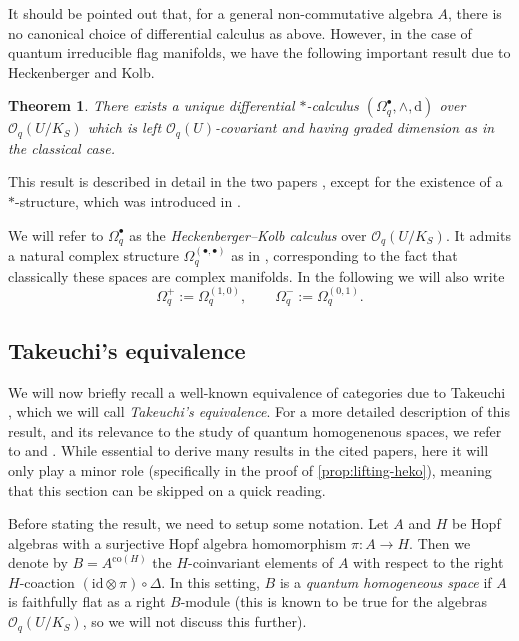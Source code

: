 \documentclass[a4paper,12pt,reqno,english]{amsart}
\numberwithin{equation}{section}
\numberwithin{figure}{section}
\theoremstyle{plain}
\newtheorem{theorem}{Theorem}[section]
\theoremstyle{plain}
\theoremstyle{plain}
\theoremstyle{plain}
\theoremstyle{plain}
\theoremstyle{definition}
\theoremstyle{definition}
\theoremstyle{definition}
\theoremstyle{remark}
\theoremstyle{definition}
\newcommand{\OqU}{\mathcal{O}_q(U)}
\newcommand{\Oqflag}{\mathcal{O}_q(U / K_S)}
\newcommand{\id}{\mathrm{id}}
\newcommand{\diff}{\mathrm{d}}
\newcommand{\diffcalc}{\Omega_q}
\begin{document}
It should be pointed out that, for a general non-commutative algebra $A$, there is no canonical choice of differential calculus as above.
However, in the case of quantum irreducible flag manifolds, we have the following important result due to Heckenberger and Kolb.

\begin{theorem}
There exists a unique differential $*$-calculus $(\diffcalc^\bullet, \wedge, \diff)$ over $\Oqflag$ which is left $\OqU$-covariant and having graded dimension as in the classical case.
\end{theorem}

This result is described in detail in the two papers \cite{locally-finite, heko}, except for the existence of a $*$-structure, which was introduced in \cite{kahler}.

We will refer to $\diffcalc^\bullet$ as the \emph{Heckenberger--Kolb calculus} over $\Oqflag$.
It admits a natural complex structure $\diffcalc^{(\bullet, \bullet)}$ as in \cite[Proposition 6.4]{levicivita-irreducible}, corresponding to the fact that classically these spaces are complex manifolds.
In the following we will also write
\[
\diffcalc^+ := \diffcalc^{(1, 0)}, \qquad
\diffcalc^- := \diffcalc^{(0, 1)}.
\]

\subsection{Takeuchi's equivalence}

We will now briefly recall a well-known equivalence of categories due to Takeuchi \cite{takeuchi}, which we will call \emph{Takeuchi's equivalence}. For a more detailed description of this result, and its relevance to the study of quantum homogenenous spaces, we refer to \cite[Section 2]{complex-structures} and \cite[Section 2.2]{levicivita-irreducible}.
While essential to derive many results in the cited papers, here it will only play a minor role (specifically in the proof of \cref{prop:lifting-heko}), meaning that this section can be skipped on a quick reading.

Before stating the result, we need to setup some notation.
Let $A$ and $H$ be Hopf algebras with a surjective Hopf algebra homomorphism $\pi: A \to H$.
Then we denote by $B = A^{\mathrm{co}(H)}$ the $H$-coinvariant elements of $A$ with respect to the right $H$-coaction $(\id \otimes \pi) \circ \Delta$.
In this setting, $B$ is a \emph{quantum homogeneous space} if $A$ is faithfully flat as a right $B$-module (this is known to be true for the algebras $\Oqflag$, so we will not discuss this further).
\end{document}
